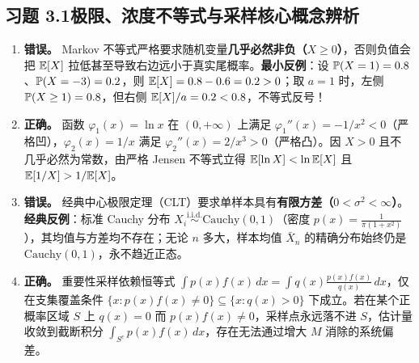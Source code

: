 \subsection*{习题 3.1\quad 极限、浓度不等式与采样核心概念辨析}
\begin{enumerate}[label=(\alph*), leftmargin=1.8em]
  \item \textbf{错误。} Markov 不等式严格要求随机变量\textbf{几乎必然非负（$X \ge 0$）}，否则负值会把 $\mathbb{E}[X]$ 拉低甚至导致右边远小于真实尾概率。\textbf{最小反例}：设 $\mathbb{P}(X = 1) = 0.8$、$\mathbb{P}(X = -3) = 0.2$，则 $\mathbb{E}[X] = 0.8 - 0.6 = 0.2 > 0$；取 $a = 1$ 时，左侧 $\mathbb{P}(X \ge 1) = 0.8$，但右侧 $\mathbb{E}[X]/a = 0.2 < 0.8$，不等式反号！
  \item \textbf{正确。} 函数 $\varphi_1(x) = \ln x$ 在 $(0, +\infty)$ 上满足 $\varphi_1''(x) = -1/x^2 < 0$（严格凹），$\varphi_2(x) = 1/x$ 满足 $\varphi_2''(x) = 2/x^3 > 0$（严格凸）。因 $X > 0$ 且不几乎必然为常数，由严格 Jensen 不等式立得 $\mathbb{E}[\ln X] < \ln\mathbb{E}[X]$ 且 $\mathbb{E}[1/X] > 1/\mathbb{E}[X]$。
  \item \textbf{错误。} 经典中心极限定理（CLT）要求单样本具有\textbf{有限方差（$0 < \sigma^2 < \infty$）}。\textbf{经典反例}：标准 Cauchy 分布 $X_i \stackrel{\text{i.i.d.}}{\sim} \mathrm{Cauchy}(0, 1)$（密度 $p(x) = \frac{1}{\pi(1+x^2)}$），其均值与方差均不存在；无论 $n$ 多大，样本均值 $\bar{X}_n$ 的精确分布始终仍是 $\mathrm{Cauchy}(0, 1)$，永不趋近正态。
  \item \textbf{正确。} 重要性采样依赖恒等式 $\int p(x)f(x)\,dx = \int q(x)\frac{p(x)f(x)}{q(x)}\,dx$，仅在支集覆盖条件 $\{x: p(x)f(x)\neq 0\} \subseteq \{x: q(x)>0\}$ 下成立。若在某个正概率区域 $S$ 上 $q(x) = 0$ 而 $p(x)f(x) \neq 0$，采样点永远落不进 $S$，估计量收敛到截断积分 $\int_{S^c} p(x)f(x)\,dx$，存在无法通过增大 $M$ 消除的系统偏差。
\end{enumerate}

